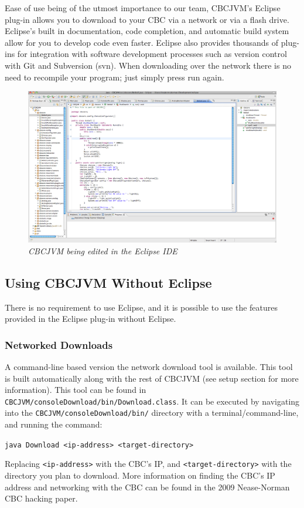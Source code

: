 \documentclass[12pt,letterpaper]{article}
\newcommand{\code}[1]{\par\texttt{#1}\par}
\begin{document}
Ease of use being of the utmost importance to our team, CBCJVM's Eclipse plug-in allows you to download to your CBC via a network or via a flash drive. Eclipse's built in documentation, code completion, and automatic build system allow for you to develop code even faster. Eclipse also provides thousands of plug-ins for integration with software development processes such as version control with Git and Subversion (svn). When downloading over the network there is no need to recompile your program; just simply press run again.

\begin{figure}[H]
\includegraphics[width=\textwidth]{eclipse.png}
\caption{\textit{CBCJVM being edited in the Eclipse IDE}}
\end{figure}


\subsection{Using CBCJVM Without Eclipse}

There is no requirement to use Eclipse, and it is possible to use the features provided in the Eclipse plug-in without Eclipse.



\subsubsection{Networked Downloads}

A command-line based version the network download tool is available. This tool is built automatically along with the rest of CBCJVM (see setup section for more information). This tool can be found in \texttt{CBCJVM/\-consoleDownload/\-bin/\-Download.\-class}. It can be executed by navigating into the \texttt{CBCJVM/\-consoleDownload/\-bin/} directory with a terminal/command-line, and running the command: \code{java Download <ip-address> <target-directory>} Replacing \texttt{<ip-address>} with the CBC's IP, and \texttt{<target-directory>} with the directory you plan to download. More information on finding the CBC's IP address and networking with the CBC can be found in the 2009 Nease-Norman CBC hacking paper.
\end{document}
